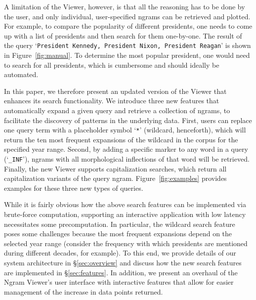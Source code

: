 \documentclass[11pt,a4paper]{article}
\newcommand{\query}[1]{\texttt{#1}}
\begin{document}
A limitation of the Viewer, however, is that all the reasoning has to be done by the user, and only individual, user-specified ngrams can be retrieved and plotted. For example, to compare the popularity of different presidents, one needs to come up with a list of presidents and then search for them one-by-one. The result of the query `\query{President Kennedy, President Nixon, President Reagan}' is shown in Figure~\ref{fig:manual}. To determine the most popular president, one would need to search for all presidents, which is cumbersome and should ideally be automated.



In this paper, we therefore present an updated version of the Viewer that enhances its search functionality. We introduce three new features that automatically expand a given query and retrieve a collection of ngrams, to facilitate the discovery of patterns in the underlying data. First, users can replace one query term with a placeholder symbol `\query{*}' (wildcard, henceforth), which will return the ten most frequent expansions of the wildcard in the corpus for the specified year range. 
Second, by adding a specific marker to any word in a query (`\query{\_INF}'), ngrams with all morphological inflections of that word will be retrieved. 
Finally, the new Viewer supports capitalization searches, which return all capitalization variants of the query ngram. Figure~\ref{fig:examples} provides examples for these three new types of queries.

While it is fairly obvious how the above search features can be implemented via brute-force computation, supporting an interactive application with low latency necessitates some precomputation. In particular, the wildcard search feature poses some challenges because the most frequent expansions depend on the selected year range (consider the frequency with which presidents are mentioned during different decades, for example). To this end, we provide details of our system architecture in \S\ref{sec:overview}  and discuss how the new search features are implemented in \S\ref{sec:features}.
In addition, we present an overhaul of the Ngram Viewer's user interface with interactive features that allow for easier management of the increase in data points returned.
\end{document}
